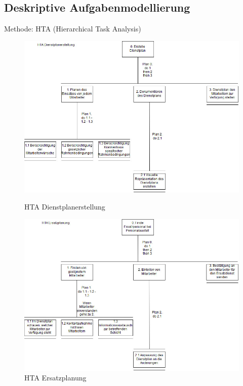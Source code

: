 \documentclass[10pt,a4paper]{article}
\begin{document}
\subsection{Deskriptive Aufgabenmodellierung}
Methode: HTA (Hierarchical Task Analysis)
\begin{figure}[H]
\includegraphics[scale=0.4]{Bilder/Dienstplanerstellung.jpg}{\centering}
\caption{HTA Dienstplanerstellung}
\vspace{3cm}
\includegraphics[scale=0.4]{Bilder/Ersatzplanung.jpg}{\centering}
\caption{HTA Ersatzplanung}
\end{figure}
\end{document}
